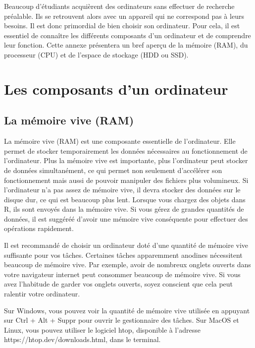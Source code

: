 \documentclass[
  letterpaper,
  DIV=11,
  numbers=noendperiod]{scrreprt}
\begin{document}
Beaucoup d'étudiants acquièrent des ordinateurs sans effectuer de
recherche préalable. Ils se retrouvent alors avec un appareil qui ne
correspond pas à leurs besoins. Il est donc primordial de bien choisir
son ordinateur. Pour cela, il est essentiel de connaître les différents
composants d'un ordinateur et de comprendre leur fonction. Cette annexe
présentera un bref aperçu de la mémoire (RAM), du processeur (CPU) et de
l'espace de stockage (HDD ou SSD).

\hypertarget{les-composants-dun-ordinateur}{%
\section{Les composants d'un
ordinateur}\label{les-composants-dun-ordinateur}}

\hypertarget{la-muxe9moire-vive-ram}{%
\subsection{La mémoire vive (RAM)}\label{la-muxe9moire-vive-ram}}

La mémoire vive (RAM) est une composante essentielle de l'ordinateur.
Elle permet de stocker temporairement les données nécessaires au
fonctionnement de l'ordinateur. Plus la mémoire vive est importante,
plus l'ordinateur peut stocker de données simultanément, ce qui permet
non seulement d'accélérer son fonctionnement mais aussi de pouvoir
manipuler des fichiers plus volumineux. Si l'ordinateur n'a pas assez de
mémoire vive, il devra stocker des données sur le disque dur, ce qui est
beaucoup plus lent. Lorsque vous chargez des objets dans R, ils sont
envoyés dans la mémoire vive. Si vous gérez de grandes quantités de
données, il est suggéréé d'avoir une mémoire vive conséquente pour
effectuer des opérations rapidement.

Il est recommandé de choisir un ordinateur doté d'une quantité de
mémoire vive suffisante pour vos tâches. Certaines tâches apparemment
anodines nécessitent beaucoup de mémoire vive. Par exemple, avoir de
nombreux onglets ouverts dans votre navigateur internet peut consommer
beaucoup de mémoire vive. Si vous avez l'habitude de garder vos onglets
ouverts, soyez conscient que cela peut ralentir votre ordinateur.

Sur Windows, vous pouvez voir la quantité de mémoire vive utilisée en
appuyant sur Ctrl + Alt + Suppr pour ouvrir le gestionnaire des tâches.
Sur MacOS et Linux, vous pouvez utiliser le logiciel htop, disponible à
l'adresse https://htop.dev/downloads.html, dans le terminal.
\end{document}
